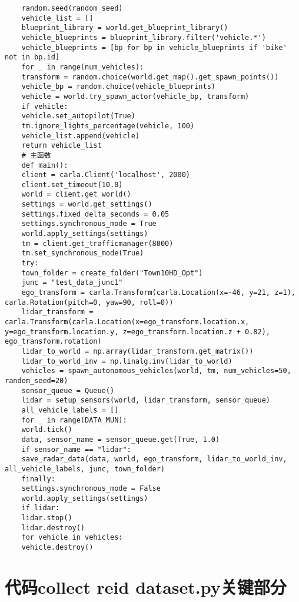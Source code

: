 \begin{lstlisting}
	random.seed(random_seed)
	vehicle_list = []
	blueprint_library = world.get_blueprint_library()
	vehicle_blueprints = blueprint_library.filter('vehicle.*')
	vehicle_blueprints = [bp for bp in vehicle_blueprints if 'bike' not in bp.id]
	for _ in range(num_vehicles):
	transform = random.choice(world.get_map().get_spawn_points())
	vehicle_bp = random.choice(vehicle_blueprints)
	vehicle = world.try_spawn_actor(vehicle_bp, transform)
	if vehicle:
	vehicle.set_autopilot(True)
	tm.ignore_lights_percentage(vehicle, 100)
	vehicle_list.append(vehicle)
	return vehicle_list
	# 主函数
	def main():
	client = carla.Client('localhost', 2000)
	client.set_timeout(10.0)
	world = client.get_world()
	settings = world.get_settings()
	settings.fixed_delta_seconds = 0.05
	settings.synchronous_mode = True
	world.apply_settings(settings)
	tm = client.get_trafficmanager(8000)
	tm.set_synchronous_mode(True)
	try:
	town_folder = create_folder("Town10HD_Opt")
	junc = "test_data_junc1"
	ego_transform = carla.Transform(carla.Location(x=-46, y=21, z=1), carla.Rotation(pitch=0, yaw=90, roll=0))
	lidar_transform = carla.Transform(carla.Location(x=ego_transform.location.x, y=ego_transform.location.y, z=ego_transform.location.z + 0.82), ego_transform.rotation)
	lidar_to_world = np.array(lidar_transform.get_matrix())
	lidar_to_world_inv = np.linalg.inv(lidar_to_world)
	vehicles = spawn_autonomous_vehicles(world, tm, num_vehicles=50, random_seed=20)
	sensor_queue = Queue()
	lidar = setup_sensors(world, lidar_transform, sensor_queue)
	all_vehicle_labels = []
	for _ in range(DATA_MUN):
	world.tick()
	data, sensor_name = sensor_queue.get(True, 1.0)
	if sensor_name == "lidar":
	save_radar_data(data, world, ego_transform, lidar_to_world_inv, all_vehicle_labels, junc, town_folder)
	finally:
	settings.synchronous_mode = False
	world.apply_settings(settings)
	if lidar:
	lidar.stop()
	lidar.destroy()
	for vehicle in vehicles:
	vehicle.destroy()
\end{lstlisting}

\section{代码collect reid dataset.py关键部分}

